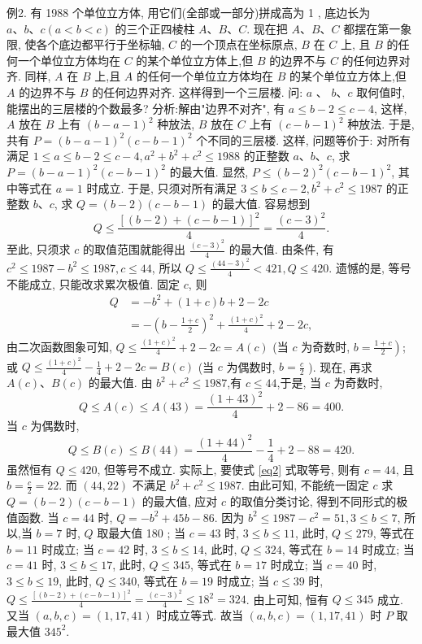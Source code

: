 例2. 有 1988 个单位立方体, 用它们(全部或一部分)拼成高为 1 , 底边长为 $a 、 b 、 c(a<b<c)$ 的三个正四棱柱 $A 、 B 、 C$. 现在把 $A 、 B 、 C$ 都摆在第一象限, 使各个底边都平行于坐标轴, $C$ 的一个顶点在坐标原点, $B$ 在 $C$ 上, 且 $B$ 的任何一个单位立方体均在 $C$ 的某个单位立方体上,但 $B$ 的边界不与 $C$ 的任何边界对齐.
同样, $A$ 在 $B$ 上,且 $A$ 的任何一个单位立方体均在 $B$ 的某个单位立方体上,但 $A$ 的边界不与 $B$ 的任何边界对齐.
这样得到一个三层楼.
问: $a$ 、 $b 、 c$ 取何值时,能摆出的三层楼的个数最多?
分析:解由"边界不对齐", 有 $a \leqslant b-2 \leqslant c-4$, 这样, $A$ 放在 $B$ 上有 $(b-a-1)^2$ 种放法, $B$ 放在 $C$ 上有 $(c-b-1)^2$ 种放法.
于是, 共有 $P=(b- a-1)^2(c-b-1)^2$ 个不同的三层楼.
这样, 问题等价于: 对所有满足 $1 \leqslant a \leqslant b-2 \leqslant c-4, a^2+b^2+c^2 \leqslant 1988$ 的正整数 $a 、 b 、 c$, 求 $P=(b-a-1)^2(c- b-1)^2$ 的最大值.
显然, $P \leqslant(b-2)^2(c-b-1)^2$, 其中等式在 $a=1$ 时成立.
于是, 只须对所有满足 $3 \leqslant b \leqslant c-2, b^2+c^2 \leqslant 1987$ 的正整数 $b 、 c$, 求 $Q=(b-2)(c- b-1)$ 的最大值.
容易想到
$$
Q \leqslant \frac{[(b-2)+(c-b-1)]^2}{4}=\frac{(c-3)^2}{4} . \label{(*)}
$$
至此, 只须求 $c$ 的取值范围就能得出 $\frac{(c-3)^2}{4}$ 的最大值.
由条件, 有 $c^2 \leqslant 1987-b^2 \leqslant 1987, c \leqslant 44$, 所以 $Q \leqslant \frac{(44-3)^2}{4}<421, Q \leqslant 420$.
遗憾的是, 等号不能成立, 只能改求累次极值.
固定 $c$, 则
$$
\begin{aligned}
Q & =-b^2+(1+c) b+2-2 c \\
& =-\left(b-\frac{1+c}{2}\right)^2+\frac{(1+c)^2}{4}+2-2 c, \label{(**)}
\end{aligned}
$$
由二次函数图象可知, $Q \leqslant \frac{(1+c)^2}{4}+2-2 c=A(c)$ (当 $c$ 为奇数时, $b= \left.\frac{1+c}{2}\right)$; 或 $Q \leqslant \frac{(1+c)^2}{4}-\frac{1}{4}+2-2 c=B(c)$ (当 $c$ 为偶数时, $b=\frac{c}{2}$ ).
现在, 再求 $A(c) 、 B(c)$ 的最大值.
由 $b^2+c^2 \leqslant 1987$,有 $c \leqslant 44$,于是, 当 $c$ 为奇数时,
$$
Q \leqslant A(c) \leqslant A(43)=\frac{(1+43)^2}{4}+2-86=400 . \label{eq1}
$$
当 $c$ 为偶数时,
$$
Q \leqslant B(c) \leqslant B(44)=\frac{(1+44)^2}{4}-\frac{1}{4}+2-88=420 .  \label{eq2}
$$
虽然恒有 $Q \leqslant 420$, 但等号不成立.
实际上, 要使式 \ref{eq2} 式取等号, 则有 $c=44$, 且 $b=\frac{c}{2}=22$. 而 $(44,22)$ 不满足 $b^2+c^2 \leqslant 1987$. 由此可知, 不能统一固定 $c$ 求 $Q=(b-2)(c-b-1)$ 的最大值, 应对 $c$ 的取值分类讨论, 得到不同形式的极值函数.
当 $c=44$ 时, $Q=-b^2+45 b-86$. 因为 $b^2 \leqslant 1987-c^2=51,3 \leqslant b \leqslant 7$, 所以,当 $b=7$ 时, $Q$ 取最大值 180 ;
当 $c=43$ 时, $3 \leqslant b \leqslant 11$, 此时, $Q \leqslant 279$, 等式在 $b=11$ 时成立;
当 $c=42$ 时, $3 \leqslant b \leqslant 14$, 此时, $Q \leqslant 324$, 等式在 $b=14$ 时成立;
当 $c=41$ 时, $3 \leqslant b \leqslant 17$, 此时, $Q \leqslant 345$, 等式在 $b=17$ 时成立;
当 $c=40$ 时, $3 \leqslant b \leqslant 19$, 此时, $Q \leqslant 340$, 等式在 $b=19$ 时成立;
当 $c \leqslant 39$ 时, $Q \leqslant \frac{[(b-2)+(c-b-1)]^2}{4}=\frac{(c-3)^2}{4} \leqslant 18^2=324$.
由上可知, 恒有 $Q \leqslant 345$ 成立.
又当 $(a, b, c)=(1,17,41)$ 时成立等式.
故当 $(a, b, c)=(1,17,41)$ 时 $P$ 取最大值 $345^2$.



